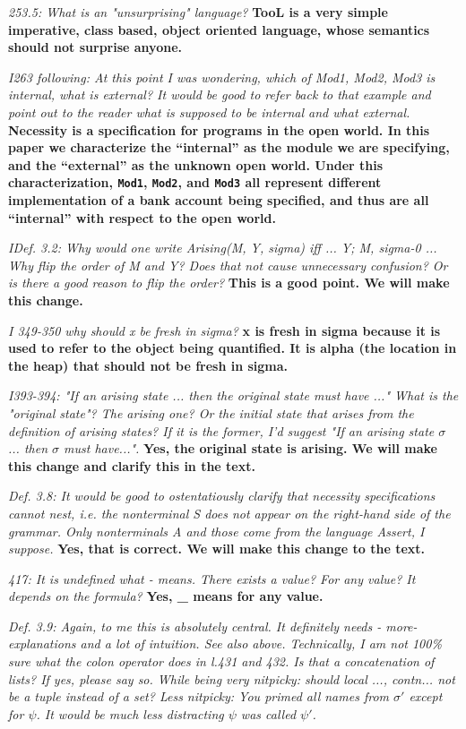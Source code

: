 \documentclass[11pt]{amsart}
\newcommand{\rev}[1]{\emph #1}
\newcommand{\us}[1]{\bf #1}
\begin{document}
{\rev {{253.5: What is an "unsurprising" language?}}}
{\us{TooL is a very simple imperative, class based, object oriented language, whose semantics should not surprise anyone.}}

{\rev {{I263 following: At this point I was wondering, which of Mod1, Mod2, Mod3 is internal, what is external? It would be good to refer back to that example and point out to the reader what is supposed to be internal and what external. }}}
{\us{Necessity is a specification for programs in the open world. In this paper we characterize the ``internal'' as the module we are specifying, and the ``external'' as the unknown open world. 
Under this characterization, \texttt{Mod1}, \texttt{Mod2}, and \texttt{Mod3} all represent different implementation of a bank account being specified, and thus
are all ``internal'' with respect to the open world.}}

 {\rev {{IDef. 3.2: Why would one write Arising(M, Y, sigma) iff ... Y; M, sigma-0 ... Why flip the order of M and Y? Does that not cause unnecessary confusion? Or is there a good reason to flip the order? }}}
 {\us{This is a good point. We will make this change.}}

{\rev {{I 349-350 why should x be fresh in sigma? }}}
{\us{x is fresh in sigma because it is used to refer to the object being quantified. It is alpha (the location in the heap) that should not be fresh in sigma.}}

{\rev {{I393-394: "If an arising state ... then the original state must have ..." What is the "original state"? The arising one? Or the initial state that arises from the definition of arising states? If it is the former, I'd suggest "If an arising state $\sigma$ ... then $\sigma$ must have...". }}}
{\us{Yes, the original state is arising. We will make this change and clarify this in the text.}}

{\rev {{Def. 3.8: It would be good to ostentatiously clarify that necessity specifications cannot nest, i.e. the nonterminal S does not appear on the right-hand side of the grammar. Only nonterminals A and those come from the language Assert, I suppose. }}}
{\us{Yes, that is correct. We will make this change to the text.}}

{\rev {{417: It is undefined what  - means. There exists a value? For any value? It depends on the formula? }}}
{\us{Yes, \_ means for any value.}}

{\rev {{ Def. 3.9: Again, to me this is absolutely central. It definitely needs - more- explanations and a lot of intuition. See also above. Technically, I am not 100\% sure what the colon operator does in l.431 and 432. Is that a concatenation of lists? If yes, please say so. While being very nitpicky: should {local ..., contn...} not be a tuple instead of a set? Less nitpicky: You primed all names from $\sigma'$ except for $\psi$. It would be much less distracting $\psi$ was called $\psi'$. }}}
\end{document}
